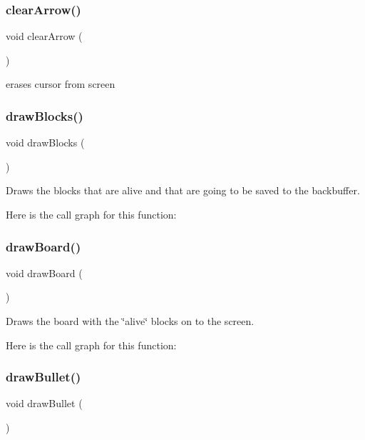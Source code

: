 \subsubsection{\texorpdfstring{clearArrow()}{clearArrow()}}
{\footnotesize\ttfamily void clear\+Arrow (\begin{DoxyParamCaption}{ }\end{DoxyParamCaption})}



erases cursor from screen 

\mbox{\label{group__game_ga172749cfe0f9091767c74e3004188ffc}} 
\subsubsection{\texorpdfstring{drawBlocks()}{drawBlocks()}}
{\footnotesize\ttfamily void draw\+Blocks (\begin{DoxyParamCaption}{ }\end{DoxyParamCaption})}



Draws the blocks that are alive and that are going to be saved to the backbuffer. 

Here is the call graph for this function\+:
\mbox{\label{group__game_ga435ba4a0d4fc47fbf7b4e13acaa312e4}} 
\subsubsection{\texorpdfstring{drawBoard()}{drawBoard()}}
{\footnotesize\ttfamily void draw\+Board (\begin{DoxyParamCaption}{ }\end{DoxyParamCaption})}



Draws the board with the \char`\"{}alive\char`\"{} blocks on to the screen. 

Here is the call graph for this function\+:
\mbox{\label{group__game_ga43d711f5646009700e97e8cce499d5fc}} 
\subsubsection{\texorpdfstring{drawBullet()}{drawBullet()}}
{\footnotesize\ttfamily void draw\+Bullet (\begin{DoxyParamCaption}{ }\end{DoxyParamCaption})}



